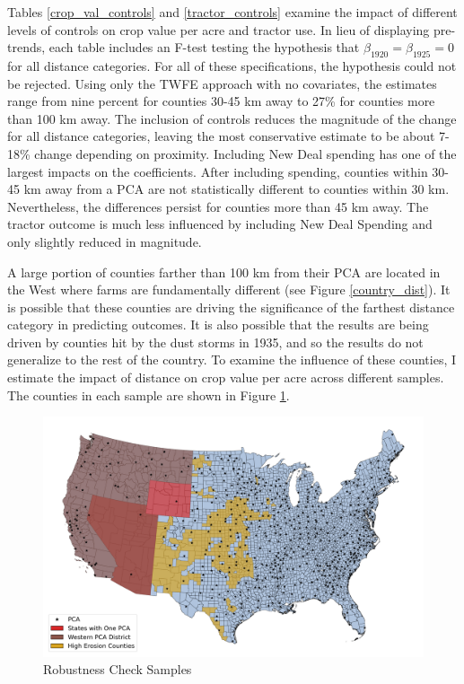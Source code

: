 \documentclass[12pt]{article}
\begin{document}
Tables \ref{crop_val_controls} and \ref{tractor_controls} examine the impact of different levels of controls on crop value per acre and tractor use.
In lieu of displaying pre-trends, each table includes an F-test testing the hypothesis that $\beta_{1920}=\beta_{1925}=0$ for all distance categories.
For all of these specifications, the hypothesis could not be rejected.
Using only the TWFE approach with no covariates, the estimates range from nine percent for counties 30-45 km away to 27\% for counties more than 100 km away.
The inclusion of controls reduces the magnitude of the change for all distance categories, leaving the most conservative estimate to be about 7-18\% change depending on proximity.
Including New Deal spending has one of the largest impacts on the coefficients.
After including spending, counties within 30-45 km away from a PCA are not statistically different to counties within 30 km.
Nevertheless, the differences persist for counties more than 45 km away.
The tractor outcome is much less influenced by including New Deal Spending and only slightly reduced in magnitude.

A large portion of counties farther than 100 km from their PCA are located in the West where farms are fundamentally different (see Figure \ref{country_dist}).
It is possible that these counties are driving the significance of the farthest distance category in predicting outcomes.
It is also possible that the results are being driven by counties hit by the dust storms in 1935, and so the results do not generalize to the rest of the country.
To examine the influence of these counties, I estimate the impact of distance on crop value per acre across different samples.
The counties in each sample are shown in Figure \ref{sample_map}.




\begin{figure}[ht]
    \caption{Robustness Check Samples}
    \label{sample_map}
\includegraphics[width=\textwidth]{sample_map.png}
\end{figure}
\end{document}
